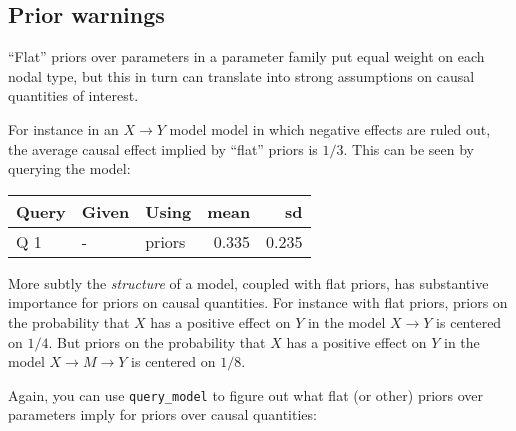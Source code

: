 \documentclass[
  12pt,
]{book}
\newenvironment{Shaded}{\begin{snugshade}}{\end{snugshade}}
\newcommand{\DataTypeTok}[1]{\textcolor[rgb]{0.13,0.29,0.53}{#1}}
\newcommand{\DecValTok}[1]{\textcolor[rgb]{0.00,0.00,0.81}{#1}}
\newcommand{\KeywordTok}[1]{\textcolor[rgb]{0.13,0.29,0.53}{\textbf{#1}}}
\newcommand{\NormalTok}[1]{#1}
\newcommand{\OperatorTok}[1]{\textcolor[rgb]{0.81,0.36,0.00}{\textbf{#1}}}
\newcommand{\StringTok}[1]{\textcolor[rgb]{0.31,0.60,0.02}{#1}}
\begin{document}
\hypertarget{prior-warnings}{%
\subsection{Prior warnings}\label{prior-warnings}}

``Flat'' priors over parameters in a parameter family put equal weight on each nodal type, but this in turn can translate into strong assumptions on causal quantities of interest.

For instance in an \(X \rightarrow Y\) model model in which negative effects are ruled out, the average causal effect implied by ``flat'' priors is \(1/3\). This can be seen by querying the model:

\begin{Shaded}
\end{Shaded}

\begin{tabular}{l|l|l|r|r}
\hline
Query & Given & Using & mean & sd\\
\hline
Q 1 & - & priors & 0.335 & 0.235\\
\hline
\end{tabular}

More subtly the \emph{structure} of a model, coupled with flat priors, has substantive importance for priors on causal quantities. For instance with flat priors, priors on the probability that \(X\) has a positive effect on \(Y\) in the model \(X \rightarrow Y\) is centered on \(1/4\). But priors on the probability that \(X\) has a positive effect on \(Y\) in the model \(X \rightarrow M \rightarrow Y\) is centered on \(1/8\).

Again, you can use \texttt{query\_model} to figure out what flat (or other) priors over parameters imply for priors over causal quantities:

\begin{Shaded}
\end{Shaded}
\end{document}
